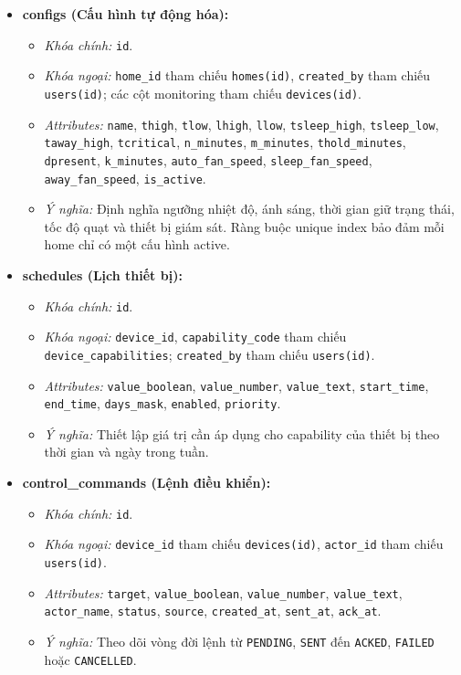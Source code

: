 \begin{itemize}
    \item \textbf{configs (Cấu hình tự động hóa):}
    \begin{itemize}
        \item \textit{Khóa chính:} \texttt{id}.
        \item \textit{Khóa ngoại:} \texttt{home\_id} tham chiếu \texttt{homes(id)}, \texttt{created\_by} tham chiếu \texttt{users(id)}; các cột monitoring tham chiếu \texttt{devices(id)}.
        \item \textit{Attributes:} \texttt{name}, \texttt{thigh}, \texttt{tlow}, \texttt{lhigh}, \texttt{llow}, \texttt{tsleep\_high}, \texttt{tsleep\_low}, \texttt{taway\_high}, \texttt{tcritical}, \texttt{n\_minutes}, \texttt{m\_minutes}, \texttt{thold\_minutes}, \texttt{dpresent}, \texttt{k\_minutes}, \texttt{auto\_fan\_speed}, \texttt{sleep\_fan\_speed}, \texttt{away\_fan\_speed}, \texttt{is\_active}.
        \item \textit{Ý nghĩa:} Định nghĩa ngưỡng nhiệt độ, ánh sáng, thời gian giữ trạng thái, tốc độ quạt và thiết bị giám sát. Ràng buộc unique index bảo đảm mỗi home chỉ có một cấu hình active.
    \end{itemize}

    \item \textbf{schedules (Lịch thiết bị):}
    \begin{itemize}
        \item \textit{Khóa chính:} \texttt{id}.
        \item \textit{Khóa ngoại:} \texttt{device\_id}, \texttt{capability\_code} tham chiếu \texttt{device\_capabilities}; \texttt{created\_by} tham chiếu \texttt{users(id)}.
        \item \textit{Attributes:} \texttt{value\_boolean}, \texttt{value\_number}, \texttt{value\_text}, \texttt{start\_time}, \texttt{end\_time}, \texttt{days\_mask}, \texttt{enabled}, \texttt{priority}.
        \item \textit{Ý nghĩa:} Thiết lập giá trị cần áp dụng cho capability của thiết bị theo thời gian và ngày trong tuần.
    \end{itemize}

    \item \textbf{control\_commands (Lệnh điều khiển):}
    \begin{itemize}
        \item \textit{Khóa chính:} \texttt{id}.
        \item \textit{Khóa ngoại:} \texttt{device\_id} tham chiếu \texttt{devices(id)}, \texttt{actor\_id} tham chiếu \texttt{users(id)}.
        \item \textit{Attributes:} \texttt{target}, \texttt{value\_boolean}, \texttt{value\_number}, \texttt{value\_text}, \texttt{actor\_name}, \texttt{status}, \texttt{source}, \texttt{created\_at}, \texttt{sent\_at}, \texttt{ack\_at}.
        \item \textit{Ý nghĩa:} Theo dõi vòng đời lệnh từ \texttt{PENDING}, \texttt{SENT} đến \texttt{ACKED}, \texttt{FAILED} hoặc \texttt{CANCELLED}.
    \end{itemize}
\end{itemize}

